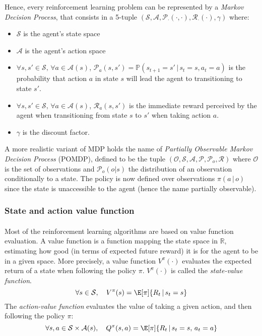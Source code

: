 {{{{				Hence, every reinforcement learning problem can be represented by a \emph{Markov Decision Process}, that consists in a 5-tuple $\left(\mathcal{S}, \mathcal{A}, \mathcal{P}_{\cdot}(\cdot,\cdot), \mathcal{R}_{\cdot}(\cdot), \gamma \right)$ where: 
				\begin{itemize}[label=$\triangleright$]
					\item $\mathcal{S}$ is the agent's state space
					\item $\mathcal{A}$ is the agent's action space
					\item $\forall s,s'\in\mathcal{S}, \, \forall a\in\mathcal{A}(s)$,  $\mathcal{P}_a(s,s') = \mathbb{P}(s_{t+1}=s'\, \vert \, s_t = s, a_t = a)$ is the probability that action $a$ in state $s$ will lead the agent to transitioning to state $s'$.
					\item $\forall s,s'\in\mathcal{S}, \, \forall a\in\mathcal{A}(s)$,  $\mathcal{R}_a(s,s')$ is the immediate reward perceived by the agent when transitioning from state $s$ to $s'$ when taking action $a$. 
					\item $\gamma$ is the discount factor. 
				\end{itemize}
				
				A more realistic variant of MDP holds the name of \emph{Partially Observable Markov Decision Process} (POMDP), defined to be the tuple $\left(\mathcal{O},\mathcal{S},\mathcal{A},\mathcal{P},\mathcal{P}_o,\mathcal{R}\right)$ where $\mathcal{O}$ is the set of observations and $\mathcal{P}_o(o\vert s)$ the distribution of an observation conditionally to a state. The policy is now defined over observations $\pi(a\, \vert \, o)$ since the state is unaccessible to the agent (hence the name partially observable). 
			}
			\subsubsection{State and action value function}
			{
				\paragraph{} Most of the reinforcement learning algorithms are based on value function evaluation. A value function is a function mapping the state space in $\mathbb{R}$, estimating how good (in terms of expected future reward) it is for the agent to be in a given space. More precisely, a value function $V^\pi(\cdot)$ evaluates the expected return of a state when following the policy $\pi$. $V^\pi(\cdot)$ is called the \emph{state-value function}. 
				\begin{equation}
					\forall{s}\in\mathcal{S}, \quad V^\pi(s) = \E[\pi]{R_t \, \vert \, s_t = s}
				\end{equation}
				The \emph{action-value function} evaluates the value of taking a given action, and then following the policy $\pi$: 
				\begin{equation}
					\forall{s,a}\in\mathcal{S}\times\mathcal{A}(s), \quad Q^\pi(s,a) = \E[\pi]{ R_t \, \vert \, s_t=s, \, a_t=a}
				\end{equation}
				
}}}}
